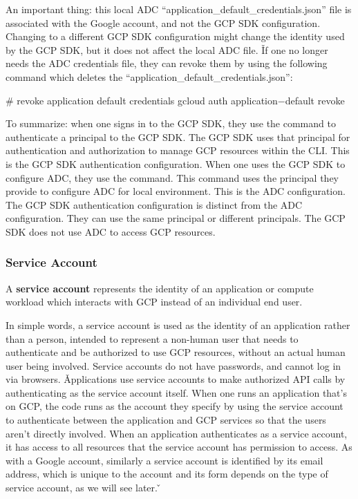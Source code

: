 An important thing: this local ADC ``application\_default\_credentials.json'' file is associated with the Google
account, and not the GCP SDK configuration. Changing to a different GCP SDK configuration might change the identity
used by the GCP SDK, but it does not affect the local ADC file. \v

If one no longer needs the ADC credentials file, they can revoke them by using the following command which deletes
the ``application\_default\_credentials.json'':
\begin{bash}
# revoke application default credentials
gcloud auth application$-$default revoke
\end{bash}

To summarize: when one signs in to the GCP SDK, they use the  command to authenticate a
principal to the GCP SDK. The GCP SDK uses that principal for authentication and authorization to manage GCP
resources within the CLI. This is the GCP SDK authentication configuration. When one uses the GCP SDK to configure
ADC, they use the  command. This command uses the principal they provide
to configure ADC for local environment. This is the ADC configuration. The GCP SDK authentication configuration is
distinct from the ADC configuration. They can use the same principal or different principals. The GCP SDK does not
use ADC to access GCP resources.


\subsubsection{Service Account}

A \textbf{service account} represents the identity of an application or compute workload which interacts with GCP
instead of an individual end user.
\ed

In simple words, a service account is used as the identity of an application rather than a person, intended to represent
a non-human user that needs to authenticate and be authorized to use GCP resources, without an actual human user being
involved. Service accounts do not have passwords, and cannot log in via browsers. \v

Applications use service accounts to make authorized API calls by authenticating as the service account itself. When
one runs an application that's on GCP, the code runs as the account they specify by using the service account to
authenticate between the application and GCP services so that the users aren't directly involved. When an application
authenticates as a service account, it has access to all resources that the service account has permission to access. As
with a Google account, similarly a service account is identified by its email address, which is unique to the account
and its form depends on the type of service account, as we will see later. \v

